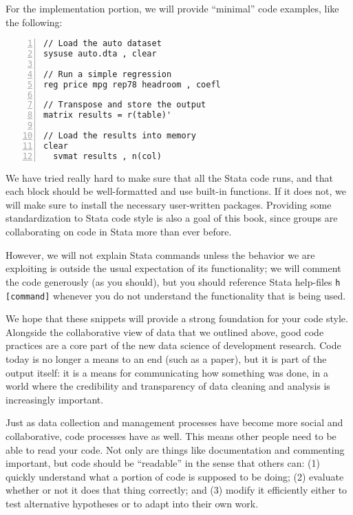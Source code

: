 For the implementation portion, we will provide ``minimal'' code examples, like the following:


\begin{Verbatim}[frame=lines,numbers=left,label=code.do]
// Load the auto dataset
sysuse auto.dta , clear

// Run a simple regression
reg price mpg rep78 headroom , coefl

// Transpose and store the output
matrix results = r(table)'

// Load the results into memory
clear
  svmat results , n(col)
\end{Verbatim}

We have tried really hard to make sure that all the Stata code runs,
and that each block should be well-formatted and use built-in functions.
If it does not, we will make sure to install the necessary user-written packages.
Providing some standardization to Stata code style is also a goal of this book,
since groups are collaborating on code in Stata more than ever before.

However, we will not explain Stata commands unless the behavior we are exploiting
is outside the usual expectation of its functionality;
we will comment the code generously (as you should),
but you should reference Stata help-files \texttt{h [command]}
whenever you do not understand the functionality that is being used.

We hope that these snippets will provide a strong foundation for your code style.
Alongside the collaborative view of data that we outlined above,
good code practices are a core part of the new data science of development research.
Code today is no longer a means to an end (such as a paper),
but it is part of the output itself: it is a means for communicating how something was done,
in a world where the credibility and transparency of data cleaning and analysis is increasingly important.

Just as data collection and management processes have become more social and collaborative,
code processes have as well. This means other people need to be able to read your code.
Not only are things like documentation and commenting important,
but code should be ``readable'' in the sense that others can:
(1) quickly understand what a portion of code is supposed to be doing;
(2) evaluate whether or not it does that thing correctly; and
(3) modify it efficiently either to test alternative hypotheses or to adapt into their own work.


